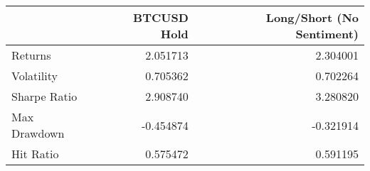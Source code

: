 \begin{tabular}{lrr}
\toprule
{} &  BTCUSD Hold &  Long/Short (No Sentiment) \\
\midrule
Returns      &     2.051713 &                   2.304001 \\
Volatility   &     0.705362 &                   0.702264 \\
Sharpe Ratio &     2.908740 &                   3.280820 \\
Max Drawdown &    -0.454874 &                  -0.321914 \\
Hit Ratio    &     0.575472 &                   0.591195 \\
\bottomrule
\end{tabular}
